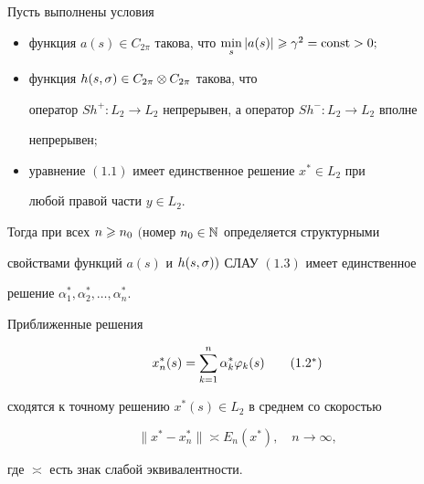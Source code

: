 \begin{thm}


Пусть выполнены условия


\begin{itemize}


\item[$\alpha$)] функция $a(s)\in C_{2\pi}$ такова, что $\min\limits_s|a(s)|\gea


\gamma^2=\const>0;$


\item[$\beta$)] функция $h(s,\sigma)\in C_{2\pi}\otimes C_{2\pi}$ такова, что


оператор $Sh^+:L_2\to L_2$ непрерывен, а оператор $Sh^-:L_2\to L_2$ вполне


непрерывен$;$


\item[$\gamma$)] уравнение $(1.1)$ имеет единственное решение $x^*\in L_2$ при


любой правой части $y\in L_2$.


\end{itemize}





Тогда при всех $n\geqslant n_0$ $($номер $n_0\in \Bbb N$ определяется структурными


свойствами функций $a(s)$ и $h(s,\sigma))$ СЛАУ $(1.3)$ имеет единственное


решение $\alpha^*_1,\alpha^*_2,\dotsc,\alpha^*_n$.


Приближенные решения


\begin{equation}


x^*_n(s)= \suml_{k=1}^n \alpha_k^*\vp_k(s)


\tag{$1.2^*$}


\end{equation}


сходятся к точному решению $x^*(s)\in L_2$ в среднем со скоростью


\begin{equation}


\|x^* - x^*_n\|\asymp E_n(x^*),\quad n\to \infty,


\end{equation}


где $\asymp$ есть знак слабой эквивалентности.


\end{thm}





